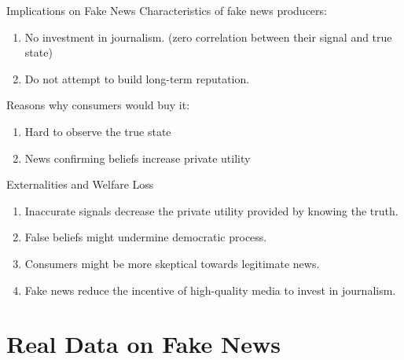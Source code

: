 \documentclass[
  10pt,
  ignorenonframetext,
  aspectratio=43,
]{beamer}
\providecommand{\tightlist}{%
  \setlength{\itemsep}{0pt}\setlength{\parskip}{0pt}}
\begin{document}
\begin{frame}{Implications on Fake News}
\protect\hypertarget{implications-on-fake-news}{}
Characteristics of fake news producers:

\begin{enumerate}
\tightlist
\item
  No investment in journalism. (zero correlation between their signal
  and true state)
\item
  Do not attempt to build long-term reputation.
\end{enumerate}

Reasons why consumers would buy it:

\begin{enumerate}
\tightlist
\item
  Hard to observe the true state
\item
  News confirming beliefs increase private utility
\end{enumerate}
\end{frame}

\begin{frame}
\begin{block}{Externalities and Welfare Loss}
\protect\hypertarget{externalities-and-welfare-loss}{}
\begin{enumerate}
\tightlist
\item
  Inaccurate signals decrease the private utility provided by knowing
  the truth.
\item
  False beliefs might undermine democratic process.
\item
  Consumers might be more skeptical towards legitimate news.
\item
  Fake news reduce the incentive of high-quality media to invest in
  journalism.
\end{enumerate}
\end{block}
\end{frame}

\hypertarget{real-data-on-fake-news}{%
\section{Real Data on Fake News}\label{real-data-on-fake-news}}
\end{document}
